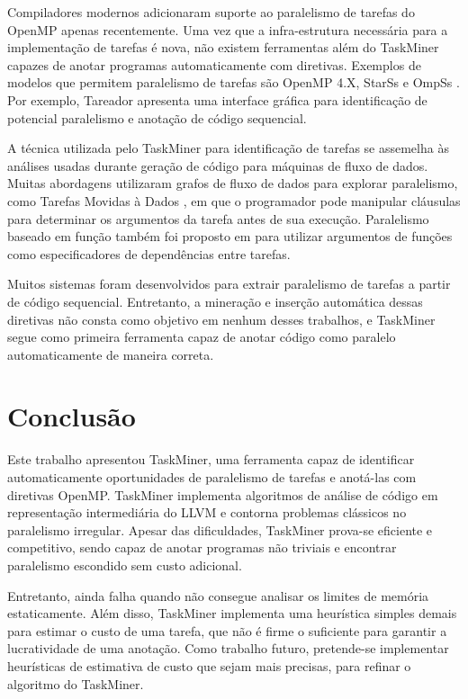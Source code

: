 \documentclass[sigplan,10pt,review]{acmart}
\newcommand\Taskminer{\mbox{\textsf{TaskMiner}}}
\begin{document}
Compiladores modernos adicionaram suporte ao paralelismo de tarefas 
do OpenMP apenas recentemente. 
Uma vez que a infra-estrutura necessária para
a implementação de tarefas é nova, não existem ferramentas 
além do {\Taskminer} capazes de anotar programas
automaticamente com diretivas. Exemplos
de modelos que permitem paralelismo de tarefas são OpenMP 4.X,
StarSs \cite{planas:hpca:2009} e OmpSs \cite{duran:ppl:2011}.
Por exemplo, Tareador \cite{Ayguade15} apresenta uma interface gráfica para identificação de potencial paralelismo e anotação de código sequencial.

A técnica utilizada pelo {\Taskminer} para identificação de tarefas se assemelha às análises usadas durante
geração de código para máquinas de fluxo de dados. Muitas abordagens utilizaram grafos
de fluxo de dados para explorar paralelismo, como Tarefas Movidas à Dados \cite{tasirlar:icpp:2011},
em que o programador pode manipular cláusulas para determinar os argumentos da tarefa
antes de sua execução. Paralelismo baseado em função também foi proposto em \cite{gupta:micro:2011}
para utilizar argumentos de funções como especificadores de dependências entre tarefas.

Muitos sistemas foram desenvolvidos para extrair paralelismo de tarefas a partir de código sequencial.
Entretanto, a mineração e inserção automática dessas diretivas não consta como objetivo
em nenhum desses trabalhos, e \Taskminer{} segue como primeira ferramenta capaz 
de anotar código como paralelo
automaticamente de maneira correta.



\section{Conclus\~{a}o}
\label{sec:conc}

Este trabalho apresentou \Taskminer{}, uma ferramenta capaz de identificar automaticamente oportunidades de paralelismo de tarefas e anotá-las com diretivas OpenMP. \Taskminer{} implementa algoritmos de análise de código em representação intermediária do LLVM e contorna problemas clássicos no paralelismo irregular. Apesar das dificuldades, \Taskminer{} prova-se eficiente e competitivo, sendo capaz de anotar programas não triviais e encontrar paralelismo escondido sem custo adicional. 

Entretanto, ainda falha quando não consegue analisar os limites de memória estaticamente. Além disso, \Taskminer{} implementa uma heurística simples demais para estimar o custo de uma tarefa, que não é firme o suficiente para garantir a lucratividade de uma anotação. Como trabalho futuro, pretende-se implementar heurísticas de estimativa de custo que sejam mais precisas, para refinar o algoritmo do \Taskminer{}.


\end{document}
